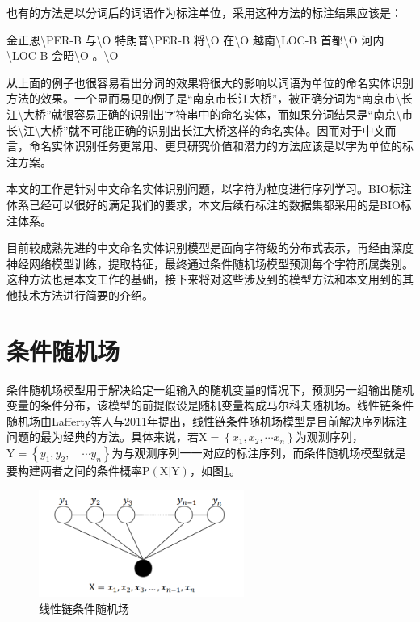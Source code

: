 \documentclass[winfonts,master,oneside,nobackinfo]{njuthesis}
\begin{document}
也有的方法是以分词后的词语作为标注单位，采用这种方法的标注结果应该是：

金正恩\textbackslash PER-B 与\textbackslash O 特朗普\textbackslash PER-B 将\textbackslash O 在\textbackslash O 越南\textbackslash LOC-B 首都\textbackslash O 河内\textbackslash LOC-B 会晤\textbackslash O 。\textbackslash O

从上面的例子也很容易看出分词的效果将很大的影响以词语为单位的命名实体识别方法的效果。一个显而易见的例子是“南京市长江大桥”，被正确分词为“南京市\textbackslash 长江\textbackslash 大桥”就很容易正确的识别出字符串中的命名实体，而如果分词结果是“南京\textbackslash 市长\textbackslash 江\textbackslash 大桥”就不可能正确的识别出长江大桥这样的命名实体。因而对于中文而言，命名实体识别任务更常用、更具研究价值和潜力的方法应该是以字为单位的标注方案。

本文的工作是针对中文命名实体识别问题，以字符为粒度进行序列学习。BIO标注体系已经可以很好的满足我们的要求，本文后续有标注的数据集都采用的是BIO标注体系。

目前较成熟先进的中文命名实体识别模型是面向字符级的分布式表示，再经由深度神经网络模型训练，提取特征，最终通过条件随机场模型预测每个字符所属类别。这种方法也是本文工作的基础，接下来将对这些涉及到的模型方法和本文用到的其他技术方法进行简要的介绍。

\section{条件随机场}
条件随机场模型用于解决给定一组输入的随机变量的情况下，预测另一组输出随机变量的条件分布，该模型的前提假设是随机变量构成马尔科夫随机场。线性链条件随机场由Lafferty等人\cite{Lafferty}与2011年提出，线性链条件随机场模型是目前解决序列标注问题的最为经典的方法。具体来说，若$\mathrm { X } = \left\{ x _ { 1 } , x _ { 2 } , \cdots x _ { n } \right\}$为观测序列，$\mathrm { Y } = \left\{ y _ { 1 } , y _ { 2 } , \quad \cdots y _ { n } \right\}$为与观测序列一一对应的标注序列，而条件随机场模型就是要构建两者之间的条件概率$\mathrm { P } ( \mathrm { X } | \mathrm { Y } )$，如图\ref{crf}。

\begin{figure}[h]
\centering
\includegraphics[width=0.6\textwidth]{./figure/线性链条件随机场.jpg}
\caption{线性链条件随机场}
\label{crf}
\end{figure}
\end{document}
